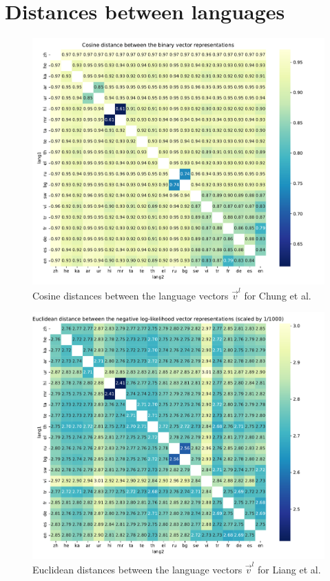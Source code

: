 \chapter{Distances between languages}

\begin{figure}[h]
    \centering
    \includegraphics[width=\textwidth]{figures/chung_distances.pdf}
    \caption{Cosine distances between the language vectors $\vec{v}^l$ for Chung et al.}
    \label{fig:chung_distances}
\end{figure}


\begin{figure}[h]
    \centering
    \includegraphics[width=\textwidth]{figures/liang_euclid_distances.pdf}
    \caption{Euclidean distances between the language vectors $\vec{v}^l$ for Liang et al.}
    \label{fig:liang_euclid_distances}
\end{figure}
